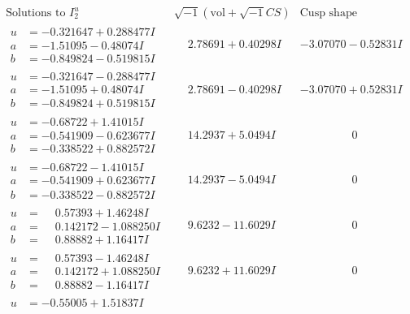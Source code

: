 \documentclass[1p]{elsarticle_modified}
\theoremstyle{definition}
\newcommand{\I}{\sqrt{-1}}
\begin{document}
$$\begin{array}{c|c|c}
\text{Solutions to }I^u_{2}& \I (\text{vol} + \sqrt{-1}CS) & \text{Cusp shape}\\
 \hline 
\begin{aligned}
u &= -0.321647 + 0.288477 I \\
a &= -1.51095 - 0.48074 I \\
b &= -0.849824 - 0.519815 I\end{aligned}
 & \phantom{-}2.78691 + 0.40298 I & -3.07070 - 0.52831 I \\ \hline\begin{aligned}
u &= -0.321647 - 0.288477 I \\
a &= -1.51095 + 0.48074 I \\
b &= -0.849824 + 0.519815 I\end{aligned}
 & \phantom{-}2.78691 - 0.40298 I & -3.07070 + 0.52831 I \\ \hline\begin{aligned}
u &= -0.68722 + 1.41015 I \\
a &= -0.541909 - 0.623677 I \\
b &= -0.338522 + 0.882572 I\end{aligned}
 & \phantom{-}14.2937 + 5.0494 I & \phantom{-0.000000 } 0 \\ \hline\begin{aligned}
u &= -0.68722 - 1.41015 I \\
a &= -0.541909 + 0.623677 I \\
b &= -0.338522 - 0.882572 I\end{aligned}
 & \phantom{-}14.2937 - 5.0494 I & \phantom{-0.000000 } 0 \\ \hline\begin{aligned}
u &= \phantom{-}0.57393 + 1.46248 I \\
a &= \phantom{-}0.142172 - 1.088250 I \\
b &= \phantom{-}0.88882 + 1.16417 I\end{aligned}
 & \phantom{-}9.6232 - 11.6029 I & \phantom{-0.000000 } 0 \\ \hline\begin{aligned}
u &= \phantom{-}0.57393 - 1.46248 I \\
a &= \phantom{-}0.142172 + 1.088250 I \\
b &= \phantom{-}0.88882 - 1.16417 I\end{aligned}
 & \phantom{-}9.6232 + 11.6029 I & \phantom{-0.000000 } 0 \\ \hline\begin{aligned}
u &= -0.55005 + 1.51837 I \\

\end{aligned}
\end{array}$$
\end{document}
